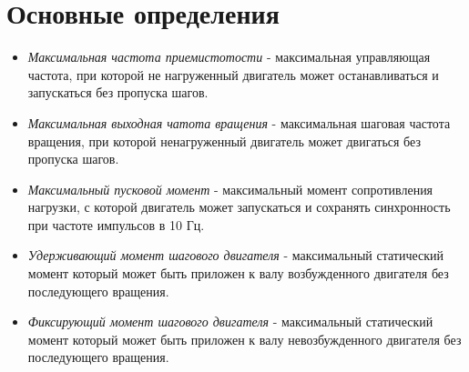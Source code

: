 \newpage
\section{ Основные определения }

\begin{itemize}
    \item \textit{Максимальная частота приемистотости} - максимальная управляющая частота, при которой не нагруженный
    двигатель может останавливаться и запускаться без пропуска шагов.

    \item \textit{Максимальная выходная чатота вращения} - максимальная шаговая частота вращения, при которой
    ненагруженный двигатель может двигаться без пропуска шагов.

    \item \textit{Максимальный пусковой момент} - максимальный момент сопротивления нагрузки, с которой двигатель может
    запускаться и сохранять синхронность при частоте импульсов в 10 Гц.

    \item \textit{Удерживающий момент шагового двигателя} - максимальный статический момент который может быть приложен
    к валу возбужденного двигателя без последующего вращения.

    \item \textit{Фиксирующий момент шагового двигателя} - максимальный статический момент который может быть приложен
    к валу невозбужденного двигателя без последующего вращения.
\end{itemize}
